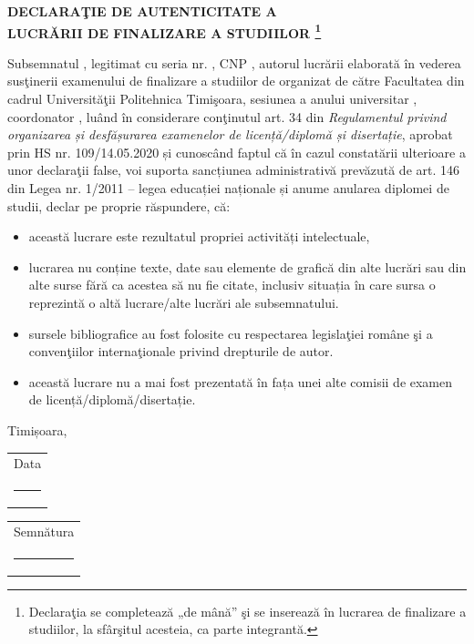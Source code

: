\documentclass[12pt]{article}
\newcommand{\field}[1]{\textbf{\MakeUppercase{#1}}}
\begin{document}
	\pagestyle{empty}
	\vfill\noindent
	\begin{center}
		\large
		\textbf{DECLARAŢIE DE AUTENTICITATE A \\ LUCRĂRII DE FINALIZARE A STUDIILOR \footnote{Declaraţia se completează „de mână” şi se inserează în lucrarea de finalizare a studiilor, la sfârşitul acesteia, ca parte integrantă.}}
	\end{center}
	\vspace{24pt}
	Subsemnatul \field{\candidateName},
	legitimat cu \field{\idType} seria \field{\idSerie} nr. \field{\idNumber},
	CNP \field{\cnp},
	autorul lucrării \field{\thesisTitle} elaborată în vederea susţinerii examenului de finalizare a studiilor de \field{\studyType} organizat de către Facultatea \field{\faculty} din cadrul Universităţii Politehnica Timişoara, sesiunea \field{\monthOfPresentation} a anului universitar \field{\academicYear}, coordonator \textbf{\coordinator}, luând în considerare conţinutul art. 34 din \textit{Regulamentul privind organizarea și desfășurarea examenelor de licență/diplomă și disertație}, aprobat prin HS nr. 109/14.05.2020 și cunoscând faptul că în cazul constatării ulterioare a unor declaraţii false, voi suporta sancțiunea administrativă prevăzută de art. 146 din Legea nr. 1/2011 – legea educației naționale și anume anularea diplomei de studii, declar pe proprie răspundere, că:
	\begin{itemize}[noitemsep]
		\setlength\itemsep{0pt}
		\item această lucrare este rezultatul propriei activități intelectuale,
		\item lucrarea nu conține texte, date sau elemente de grafică din alte lucrări sau din alte surse fără ca acestea să nu fie citate, inclusiv situația în care sursa o reprezintă o altă lucrare/alte lucrări ale subsemnatului.
		\item sursele bibliografice au fost folosite cu respectarea legislaţiei române şi a convenţiilor internaţionale privind drepturile de autor.
		\item această lucrare nu a mai fost prezentată în fața unei alte comisii de examen de licență/diplomă/disertație.
	\end{itemize}
	\vfill
	Timișoara,\par
	\vspace{12pt}
	\hfill%
	\begin{tabular}[t]{c}
		Data\\[1em] \rule{10em}{0.4pt}
	\end{tabular}%
	\hfill%
	\begin{tabular}[t]{c}
		Semnătura\\[1em] \rule{10em}{0.4pt}
	\end{tabular}%
	\hfill\strut
	\vspace*{24pt}
\end{document}
